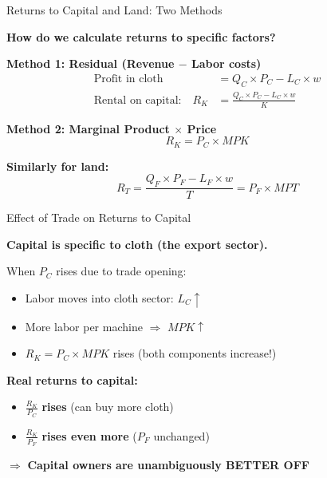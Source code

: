 \documentclass{beamer}
\begin{document}
\begin{frame}{Returns to Capital and Land: Two Methods}

\textbf{How do we calculate returns to specific factors?}

\vspace{0.3cm}

\textbf{Method 1: Residual (Revenue $-$ Labor costs)}
\begin{align*}
\text{Profit in cloth} &= Q_C \times P_C - L_C \times w \\
\text{Rental on capital:} \quad R_K &= \frac{Q_C \times P_C - L_C \times w}{K}
\end{align*}

\vspace{0.3cm}

\textbf{Method 2: Marginal Product $\times$ Price}
$$R_K = P_C \times MPK$$

\vspace{0.3cm}

\textbf{Similarly for land:}
$$R_T = \frac{Q_F \times P_F - L_F \times w}{T} = P_F \times MPT$$

\end{frame}


\begin{frame}{Effect of Trade on Returns to Capital}

\textbf{Capital is specific to cloth (the export sector).}

\vspace{0.3cm}

When $P_C$ rises due to trade opening:

\begin{itemize}
    \item Labor moves into cloth sector: $L_C \uparrow$
    
    \vspace{0.2cm}
    
    \item More labor per machine $\Rightarrow$ $MPK \uparrow$
    
    \vspace{0.2cm}
    
    \item $R_K = P_C \times MPK$ rises (both components increase!)
\end{itemize}

\vspace{0.3cm}

\textbf{Real returns to capital:}
\begin{itemize}
    \item $\frac{R_K}{P_C}$ \textbf{rises} (can buy more cloth)
    \item $\frac{R_K}{P_F}$ \textbf{rises even more} ($P_F$ unchanged)
\end{itemize}

\vspace{0.3cm}

$\Rightarrow$ \textcolor{capitalcolor}{\textbf{Capital owners are unambiguously BETTER OFF}}

\end{frame}
\end{document}
